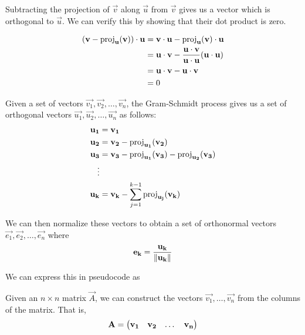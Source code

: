 \documentclass{article}
\begin{document}
Subtracting the projection of $\vec{v}$ along $\vec{u}$ from $\vec{v}$ gives us a vector
which is orthogonal to $\vec{u}$. We can verify this by showing that their dot product
is zero.

\begin{align}
    (\mathbf{v} - \operatorname{proj}_{\mathbf{u}}(\mathbf{v})) \cdot \mathbf{u} &= \mathbf{v} \cdot \mathbf{u} - \operatorname{proj}_{\mathbf{u}}(\mathbf{v}) \cdot \mathbf{u} \\
    &= \mathbf{u} \cdot \mathbf{v} - \frac{\mathbf{u} \cdot \mathbf{v}}{\mathbf{u} \cdot \mathbf{u}} (\mathbf{u} \cdot \mathbf{u}) \\
    &= \mathbf{u} \cdot \mathbf{v} - \mathbf{u} \cdot \mathbf{v} \\
    &= 0
\end{align}

Given a set of vectors $\vec{v_1}, \vec{v_2}, \dots, \vec{v_n}$, the Gram-Schmidt process
gives us a set of orthogonal vectors $\vec{u_1}, \vec{u_2}, \dots, \vec{u_n}$ as follows: 
\begin{align}
    \mathbf{u_1} &= \mathbf{v_1} \\
    \mathbf{u_2} &= \mathbf{v_2} - \operatorname{proj}_{\mathbf{u_1}}(\mathbf{v_2}) \\
    \mathbf{u_3} &= \mathbf{v_3} - \operatorname{proj}_{\mathbf{u_1}}(\mathbf{v_3}) - \operatorname{proj}_{\mathbf{u_2}}(\mathbf{v_3}) \\
    \vdots \\
    \mathbf{u_k} &= \mathbf{v_k} - \sum_{j=1}^{k-1} \operatorname{proj}_{\mathbf{u_j}}(\mathbf{v_k})
\end{align}

We can then normalize these vectors to obtain a set of orthonormal vectors
$\vec{e_1}, \vec{e_2}, \dots, \vec{e_n}$ where
\begin{align}
    \mathbf{e_k} = \frac{\mathbf{u_k}}{\left\lVert\mathbf{u_k}\right\rVert}
\end{align}

We can express this in pseudocode as 

\begin{algorithm}
\end{algorithm}

Given an $n \times n$ matrix $\vec{A}$, we can construct the vectors
$\vec{v_1}, \dots, \vec{v_n}$ from the columns of the matrix. That is,
\begin{align}
    \mathbf{A} = \begin{pmatrix}\mathbf{v_1} & \mathbf{v_2} & \dots & \mathbf{v_n}\end{pmatrix}
\end{align}
\end{document}
